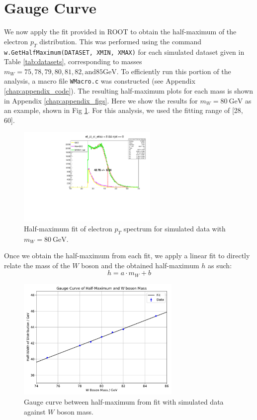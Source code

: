 \documentclass[a4paper]{report}
\numberwithin{equation}{section}
\begin{document}
\section{Gauge Curve}

We now apply the fit provided in ROOT to obtain the half-maximum of the electron $p_T$ distribution. This was performed using the 
command \texttt{w.GetHalfMaximum(DATASET, XMIN, XMAX)} for each simulated dataset given in Table \ref{tab:datasets}, 
corresponding to masses $m_W = 75, 78, 79, 80, 81, 82, \mathrm{ and } 85 \si{\giga\electronvolt}$. To efficiently run this portion 
of the analysis, a macro file \texttt{WMacro.c} was constructed (see Appendix \ref{chap:appendix_code}). The resulting half-maximum plots 
for each mass is shown in Appendix \ref{chap:appendix_figs}. Here we show the results for $m_W = \SI{80}{\giga\electronvolt}$ as 
an example, shown in Fig \ref{fig:hm_m80}. For this analysis, we used the fitting range of [28, 60].

\begin{figure}[htpb]
    \centering
    \includegraphics[width=0.6\textwidth]{hm_80.pdf}
    \caption{Half-maximum fit of electron $p_T$ spectrum for simulated data with $m_W = \SI{80}{\giga\electronvolt}$.}
    \label{fig:hm_m80}
\end{figure}

Once we obtain the half-maximum from each fit, we apply a linear fit to directly relate the mass of the $W$ boson and the 
obtained half-maximum $h$ as such: 
\begin{equation}
    h = a \cdot m_W + b
    \label{eq:half_max}
\end{equation}

\begin{figure}[htpb]
    \centering
    \includegraphics[width=0.7\textwidth]{gauge_curve.pdf}
    \caption{Gauge curve between half-maximum from fit with simulated data against $W$ boson mass.}
    \label{fig:gauge_curve}
\end{figure}
\end{document}
